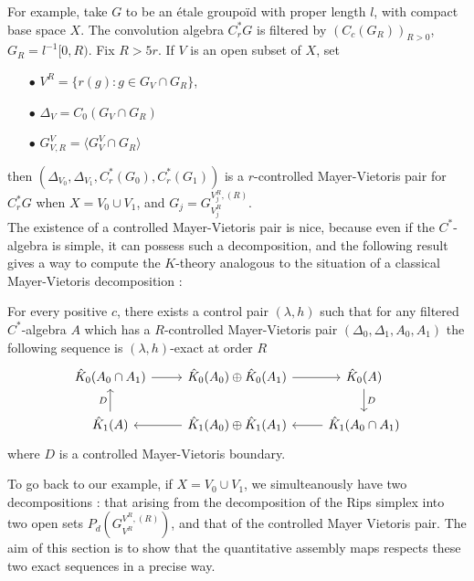 For example, take $G$ to be an étale groupoïd with proper length $l$, with compact base space $X$. The convolution algebra $C^*_r G$ is filtered by $(C_c(G_R))_{R>0}$, $G_R=l^{-1}[0,R)$. Fix $R>5r$. If $V$ is an open subset of $X$, set \\

\begin{itemize}
\item[$\bullet$] $V^R= \{r(g) : g\in G_V\cap G_R\}$,
\item[$\bullet$] $\Delta_V = C_0(G_V\cap G_R)$
\item[$\bullet$] $G_{V,R}^V = \langle G_V^V \cap G_R \rangle$\\
\end{itemize} 

then $(\Delta_{V_0},\Delta_{V_1}, C_r^*(G_0),C_r^*(G_1))$ is a $r$-controlled Mayer-Vietoris pair for $C^*_r G$ when $X=V_0\cup V_1$, and $G_j = G_{V_j^R}^{V_j^R , (R)}$.\\

The existence of a controlled Mayer-Vietoris pair is nice, because even if the $C^*$-algebra is simple, it can possess such a decomposition, and the following result gives a way to compute the $K$-theory analogous to the situation of a classical Mayer-Vietoris decomposition :

\begin{thm}
For every positive $c$, there exists a control pair $(\lambda,h)$ such that for any filtered $C^*$-algebra $A$ which has a $R$-controlled Mayer-Vietoris pair $(\Delta_0,\Delta_1,A_0,A_1)$ the following sequence is $(\lambda,h)$-exact at order $R$
\[\begin{tikzcd}
\hat K_0(A_0\cap A_1 ) \arrow{r}& \hat K_0(A_0)\arrow{r}\oplus \hat K_0(A_1) & \hat K_0(A)\arrow{d}{D} \\
\arrow{u}{D}\hat K_1(A) &\arrow{l} \hat K_1(A_0)\oplus \hat K_1(A_1) & \arrow{l}\hat K_1(A_0\cap A_1) 
\end{tikzcd}\]
where $D$ is a controlled Mayer-Vietoris boundary.\\
\end{thm}

To go back to our example, if $X=V_0\cup V_1$, we simulteanously have two decompositions : that arising from the decomposition of the Rips simplex into two open sets $P_d(G^{V^R,(R)}_{V^R})$, and that of the controlled Mayer Vietoris pair. The aim of this section is to show that the quantitative assembly maps respects these two exact sequences in a precise way.\\

